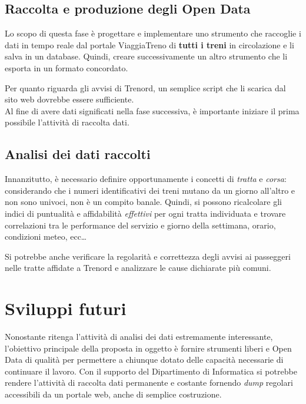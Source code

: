 \documentclass[italian,11pt,a4paper,final]{article}
\begin{document}
	\subsection{Raccolta e produzione degli Open Data}
	Lo scopo di questa fase è progettare e implementare uno strumento che raccoglie i dati in tempo reale dal portale ViaggiaTreno di \textbf{tutti i treni} in circolazione e li salva in un database.
	Quindi, creare successivamente un altro strumento che li esporta in un formato concordato. 
	
	Per quanto riguarda gli avvisi di Trenord, un semplice script che li scarica dal sito web dovrebbe essere sufficiente. \\
	
	Al fine di avere dati significati nella fase successiva, è importante iniziare il prima possibile l'attività di raccolta dati.
	
	\subsection{Analisi dei dati raccolti}
	Innanzitutto, è necessario definire opportunamente i concetti di \textit{tratta} e \textit{corsa}: considerando che i numeri identificativi dei treni mutano da un giorno all'altro e non sono univoci, non è un compito banale.
	Quindi, si possono ricalcolare gli indici di puntualità e affidabilità \textit{effettivi} per ogni tratta individuata e trovare correlazioni tra le performance del servizio e giorno della settimana, orario, condizioni meteo, ecc\ldots
	
	Si potrebbe anche verificare la regolarità e correttezza degli avvisi ai passeggeri nelle tratte affidate a Trenord e analizzare le cause dichiarate più comuni. \\
	
	\section{Sviluppi futuri}
	
	Nonostante ritenga l'attività di analisi dei dati estremamente interessante, l'obiettivo principale della proposta in oggetto è fornire strumenti liberi e Open Data di qualità per permettere a chiunque dotato delle capacità necessarie di continuare il lavoro. 
	Con il supporto del Dipartimento di Informatica si potrebbe rendere l'attività di raccolta dati permanente e costante fornendo \textit{dump} regolari accessibili da un portale web, anche di semplice costruzione.
	
\end{document}

